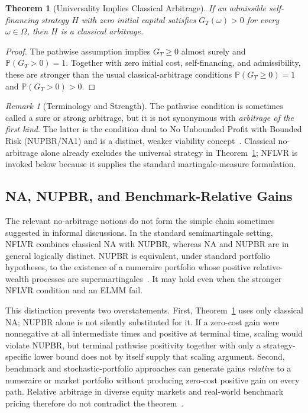 \documentclass[aps,pra,reprint,superscriptaddress,amsmath,amssymb,floatfix]{revtex4-2}
\theoremstyle{plain}
\newtheorem{theorem}{Theorem}
\theoremstyle{definition}
\theoremstyle{remark}
\newtheorem{remark}{Remark}
\begin{document}
\begin{theorem}[Universality Implies Classical Arbitrage]
  \label{thm:arbitrage}
  If an admissible self-financing strategy \(H\) with zero initial capital
  satisfies \(G_T(\omega)>0\) for every \(\omega\in\Omega\), then \(H\) is a
  classical arbitrage.
\end{theorem}

\begin{proof}
The pathwise assumption implies \(G_T\geq0\) almost surely and
\(\mathbb{P}(G_T>0)=1\). Together with zero initial cost, self-financing, and
admissibility, these are stronger than the usual classical-arbitrage
conditions \(\mathbb{P}(G_T\geq0)=1\) and
\(\mathbb{P}(G_T>0)>0\).
\end{proof}

\begin{remark}[Terminology and Strength]
The pathwise condition is sometimes called a sure or strong arbitrage, but it
is not synonymous with \emph{arbitrage of the first kind}. The latter is the
condition dual to No Unbounded Profit with Bounded Risk (NUPBR/NA1) and is a
distinct, weaker viability concept~\cite{Kardaras2012}. Classical
no-arbitrage alone already excludes the universal strategy in
Theorem~\ref{thm:arbitrage}; NFLVR is invoked below because it supplies the
standard martingale-measure formulation.
\end{remark}

\subsection{NA, NUPBR, and Benchmark-Relative Gains}

The relevant no-arbitrage notions do not form the simple chain sometimes
suggested in informal discussions. In the standard semimartingale setting,
NFLVR combines classical NA with NUPBR, whereas NA and NUPBR are in general
logically distinct. NUPBR is equivalent, under standard portfolio hypotheses,
to the existence of a numeraire portfolio whose positive relative-wealth
processes are supermartingales~\cite{KaratzasKardaras2007,Kardaras2012}.
It may hold even when the stronger NFLVR condition and an ELMM fail.

This distinction prevents two overstatements. First, Theorem~\ref{thm:arbitrage}
uses only classical NA; NUPBR alone is not silently substituted for it. If a
zero-cost gain were nonnegative at all intermediate times and positive at
terminal time, scaling would violate NUPBR, but terminal pathwise positivity
together with only a strategy-specific lower bound does not by itself supply
that scaling argument. Second, benchmark and stochastic-portfolio approaches
can generate gains \emph{relative} to a numeraire or market portfolio without
producing zero-cost positive gain on every path. Relative arbitrage in diverse
equity markets and real-world benchmark pricing therefore do not contradict
the theorem~\cite{FernholzKaratzasKardaras2005,PlatenHeath2010}.
\end{document}
